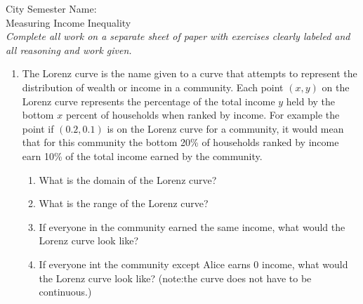 \documentclass[12pt]{article}
\theoremstyle{plain}     %
\begin{document}
\large
City Semester  \hspace{8cm} Name:\makebox[6cm]{\hrulefill}
\\
Measuring Income Inequality\\
\normalsize 
\emph{Complete all work on a separate sheet of paper with exercises clearly labeled and all reasoning and work given.}\\[.5cm]
\begin{enumerate}
	\item The Lorenz curve is the name given to a curve that attempts to represent the distribution of wealth or income in a community. Each point $(x,y)$ on the Lorenz curve represents the percentage of the total income $y$ held by the bottom $x$ percent of households  when ranked by income. For example the point if $(0.2,0.1)$ is on the Lorenz curve for a community, it would mean that for this community the bottom 20\% of households ranked by income earn 10\% of the total income earned by the community.
		\begin{enumerate}
		\item What is the domain of the Lorenz curve?
		\item What is the range of the Lorenz curve?
		\item If everyone in the community earned the same income, what would the Lorenz curve look like?
		\item If everyone int the community except Alice earns 0 income, what would the Lorenz curve look like? (note:the curve does not have to be continuous.)
		

\end{enumerate}
\end{enumerate}
\end{document}
